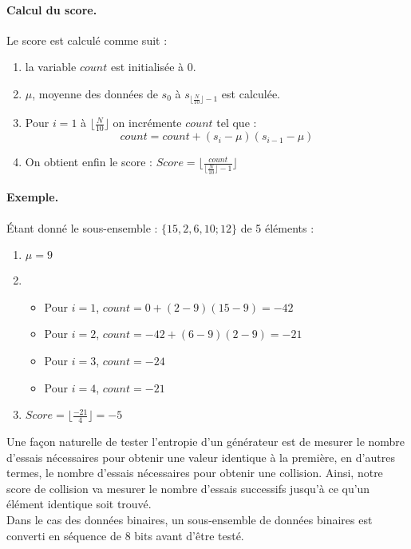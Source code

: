 \paragraph{Calcul du score.\\}
Le score est calculé comme suit : 
\begin{enumerate}
\item la variable $count$ est initialisée à 0.
\item $\mu$, moyenne des données de $s_0$ à $s_{\lfloor\frac{N}{10}\rfloor-1}$ est calculée.
\item Pour $i=1$ à $\lfloor\frac{N}{10}\rfloor$ on incrémente $count$ tel que :
$$count = count + (s_i - \mu)(s_{i-1} - \mu)$$
\item On obtient enfin le score : $Score = \lfloor \frac{count}{\lfloor\frac{N}{10}\rfloor-1} \rfloor$
\end{enumerate}

\paragraph{Exemple.\\}
Étant donné le sous-ensemble : $\lbrace 15, 2 ,6 , 10; 12 \rbrace$ de 5 éléments :
\begin{enumerate}
\item $\mu = 9$
\item 	\begin{itemize}
		\item Pour $i=1$, $count =0 + (2-9)(15-9) = -42$
		\item Pour $i=2$, $count = -42 + (6-9)(2-9) = -21$
		\item Pour $i=3$, $count = -24$
		\item Pour $i=4$, $count = -21$
		\end{itemize}
\item $Score = \lfloor \frac{-21}{4} \rfloor = -5$
\end{enumerate}

Une façon naturelle de tester l'entropie d'un générateur est de mesurer le nombre d'essais nécessaires pour obtenir une valeur identique à la première, en d'autres termes, le nombre d'essais nécessaires pour obtenir une collision. Ainsi, notre score de collision va mesurer le nombre d'essais successifs jusqu'à ce qu'un élément identique soit trouvé.\\


Dans le cas des données binaires, un sous-ensemble de données binaires est converti en séquence de 8 bits avant d'être testé. \\

